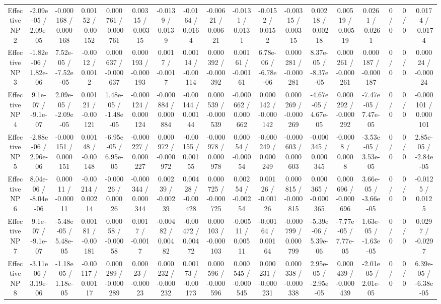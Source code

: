\documentclass[10pt]{article}
\begin{document}
\begin{table}[htbp]
\begin{center}
\begin{tabular}{|c|c|c|c|c|c|c|c|c|c|c|c|c|c|c|c|c|c|}
  Effective NP 2 & -2.09e-05 / 2.09e-05 & -0.000168 / 0.000168 & 0.00152 / -0.00152 & 0.000761 / -0.000761 & 0.00315 / -0.00315 & -0.0139 / 0.0139 & -0.0164 / 0.0164 & -0.00621 / 0.00621 & -0.0131 / 0.0131 & -0.0152 / 0.0152 & -0.00315 / 0.00315 & 0.00218 / -0.00218 & 0.00519 / -0.00519 & 0.0261 / -0.0261 & 0 / 0 & 0 / 0 & 0.0174 / -0.0174 \\ 
  Effective NP 3 & -1.82e-06 / 1.82e-06 & 7.52e-05 / -7.52e-05 & -0.0012 / 0.0012 & 0.000637 / -0.000637 & 0.000193 / -0.000193 & 0.0017 / -0.0017 & 0.00114 / -0.00114 & 0.000392 / -0.000392 & 0.00161 / -0.00161 & 6.78e-06 / -6.78e-06 & 0.000281 / -0.000281 & 8.37e-05 / -8.37e-05 & 0.000261 / -0.000261 & 0.000187 / -0.000187 & 0 / 0 & 0 / 0 & 0.00024 / -0.00024 \\ 
  Effective NP 4 & 9.1e-07 / -9.1e-07 & 2.09e-05 / -2.09e-05 & 0.00121 / -0.00121 & 1.48e-05 / -1.48e-05 & -0.000124 / 0.000124 & -0.000884 / 0.000884 & -0.00144 / 0.00144 & 0.000539 / -0.000539 & -0.000662 / 0.000662 & 0.000142 / -0.000142 & 0.000269 / -0.000269 & -4.67e-05 / 4.67e-05 & 0.000292 / -0.000292 & -7.47e-05 / 7.47e-05 & 0 / 0 & 0 / 0 & -0.000101 / 0.000101 \\ 
  Effective NP 5 & -2.88e-06 / 2.96e-06 & -0.000151 / 0.000151 & 0.00148 / -0.00148 & -6.95e-05 / 6.95e-05 & -0.000227 / 0.000227 & 0.000972 / -0.000972 & -0.00155 / 0.00155 & -0.000978 / 0.000978 & 0.00054 / -0.00054 & -0.000249 / 0.000249 & -0.000603 / 0.000603 & -0.000345 / 0.000345 & -0.0008 / 0.0008 & -3.53e-05 / 3.53e-05 & 0 / 0 & 0 / 0 & 2.85e-05 / -2.84e-05 \\ 
  Effective NP 6 & 8.04e-06 / -8.04e-06 & 0.00011 / -0.00011 & -0.00214 / 0.00214 & -0.00026 / 0.00026 & -0.000344 / 0.000344 & 0.00239 / -0.00239 & 0.00428 / -0.00428 & 0.000725 / -0.000725 & 0.00254 / -0.00254 & 0.00126 / -0.00126 & 0.000815 / -0.000815 & 0.000365 / -0.000365 & 0.000696 / -0.000696 & 3.66e-05 / -3.66e-05 & 0 / 0 & 0 / 0 & -0.0125 / 0.0125 \\ 
  Effective NP 7 & 9.1e-07 / -9.1e-07 & -5.48e-05 / 5.48e-05 & 0.00181 / -0.00181 & 0.00058 / -0.00058 & 0.0017 / -0.0017 & -0.00482 / 0.00482 & -0.00472 / 0.00472 & 0.000103 / -0.000103 & -0.00511 / 0.00511 & -0.00164 / 0.00164 & -0.000799 / 0.000799 & -5.39e-06 / 5.39e-06 & -7.77e-05 / 7.77e-05 & 1.63e-05 / -1.63e-05 & 0 / 0 & 0 / 0 & 0.0297 / -0.0297 \\ 
  Effective NP 8 & -3.11e-06 / 3.19e-06 & -1.18e-05 / 1.18e-05 & -0.00117 / 0.00117 & 0.000289 / -0.000289 & 0.00023 / -0.00023 & 0.000232 / -0.000232 & 0.00173 / -0.00173 & 0.000596 / -0.000596 & 0.000545 / -0.000545 & 0.000231 / -0.000231 & 0.000338 / -0.000338 & 2.95e-05 / -2.95e-05 & 0.000439 / -0.000439 & -2.01e-05 / 2.01e-05 & 0 / 0 & 0 / 0 & 6.39e-05 / -6.38e-05 \\ 

\end{tabular}
\end{center}
\end{table}
\end{document}
